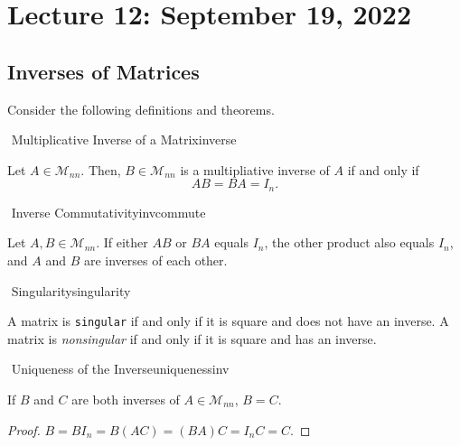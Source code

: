 \pagebreak

\section{Lecture 12: September 19, 2022}

    \subsection{Inverses of Matrices}

        Consider the following definitions and theorems.
        \begin{definition}{\Stop\,\,Multiplicative Inverse of a Matrix}{inverse}

            Let \(A\in\mathcal{M}_{nn}\). Then, \(B\in\mathcal{M}_{nn}\) is a multipliative inverse of \(A\) if and only if 
            \begin{equation*}
                AB=BA=I_n.
            \end{equation*}
            
        \end{definition}
        \begin{theorem}{\Stop\,\,Inverse Commutativity}{invcommute}
            
            Let \(A,B\in\mathcal{M}_{nn}\). If either \(AB\) or \(BA\) equals \(I_n\), the other product also equals \(I_n\), and \(A\) and \(B\) are inverses of each other.
            
        \end{theorem}
        \begin{definition}{\Stop\,\,Singularity}{singularity}

            A matrix is \texttt{singular} if and only if it is square and does not have an inverse. A matrix is \textit{nonsingular} if and only if it is square and has an inverse.
            
        \end{definition}
        \begin{theorem}{\Stop\,\,Uniqueness of the Inverse}{uniquenessinv}

            If \(B\) and \(C\) are both inverses of \(A\in\mathcal{M}_{nn}\), \(B=C\).
            \begin{proof}
                    \(B=BI_n=B(AC)=(BA)C=I_nC=C\).
             \end{proof}
            
        \end{theorem}
        \vphantom
